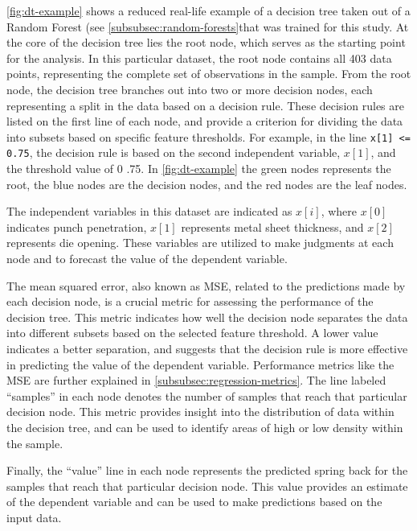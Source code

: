 {\cref{fig:dt-example} shows a reduced real-life example of a decision tree taken out of a Random Forest
(see \cref{subsubsec:random-forests}that was trained for this study.
At the core of the decision tree lies the root node, which serves as the starting point for the analysis.
In this particular dataset, the root node contains all 403 data points, representing the complete set of observations
in the sample.
From the root node, the decision tree branches out into two or more decision nodes, each representing a split in the
data based on a decision rule.
These decision rules are listed on the first line of each node, and provide a criterion for dividing the data into
subsets based on specific feature thresholds.
For example, in the line \texttt{x[1] <= 0.75}, the decision rule is based on the second independent variable,
$x[1]$, and the threshold value of 0 .75.
In \cref{fig:dt-example} the green nodes represents the root, the blue nodes are the decision nodes, and the red
nodes are the leaf nodes.

The independent variables in this dataset are indicated as $x[i]$, where $x[0]$ indicates punch penetration, $x[1]$
represents metal sheet thickness, and $x[2]$ represents die opening.
These variables are utilized to make judgments at each node and to forecast the value of the dependent variable.

The mean squared error, also known as MSE, related to the predictions made by each decision node, is a crucial metric
for assessing the performance of the decision tree.
This metric indicates how well the decision node separates the data into different subsets based on the selected
feature threshold.
A lower value indicates a better separation, and suggests that the decision rule is more effective in predicting the
value of the dependent variable.
Performance metrics like the \ac{MSE} are further explained in \ref{subsubsec:regression-metrics}.
The line labeled ``samples'' in each node denotes the number of samples that reach that particular decision node.
This metric provides insight into the distribution of data within the decision tree, and can be used to identify
areas of high or low density within the sample.

Finally, the ``value'' line in each node represents the predicted spring back for the samples that reach that
particular decision node.
This value provides an estimate of the dependent variable and can be used to make predictions based on the input data.

}
